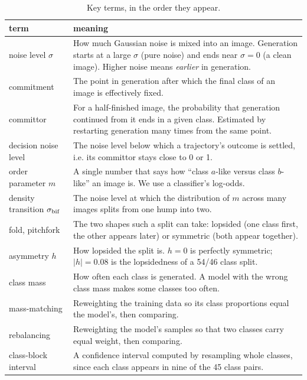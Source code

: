 \documentclass[11pt]{article}
\newcommand{\sbif}{\sigma_{\rm bif}}
\begin{document}
\begin{table}[t]
\centering
\caption{Key terms, in the order they appear.}
\label{tab:glossary}
\small
\begin{tabular}{p{3.6cm}p{11.4cm}}
\toprule
term & meaning \\
\midrule
noise level $\sigma$ & How much Gaussian noise is mixed into an image. Generation starts at a large $\sigma$ (pure noise) and ends near $\sigma=0$ (a clean image). Higher noise means \emph{earlier} in generation. \\
commitment & The point in generation after which the final class of an image is effectively fixed. \\
committor & For a half-finished image, the probability that generation continued from it ends in a given class. Estimated by restarting generation many times from the same point. \\
decision noise level & The noise level below which a trajectory's outcome is settled, i.e. its committor stays close to 0 or 1. \\
order parameter $m$ & A single number that says how ``class $a$-like versus class $b$-like'' an image is. We use a classifier's log-odds. \\
density transition $\sbif$ & The noise level at which the distribution of $m$ across many images splits from one hump into two. \\
fold, pitchfork & The two shapes such a split can take: lopsided (one class first, the other appears later) or symmetric (both appear together). \\
asymmetry $h$ & How lopsided the split is. $h=0$ is perfectly symmetric; $|h|=0.08$ is the lopsidedness of a 54/46 class split. \\
class mass & How often each class is generated. A model with the wrong class mass makes some classes too often. \\
mass-matching & Reweighting the training data so its class proportions equal the model's, then comparing. \\
rebalancing & Reweighting the model's samples so that two classes carry equal weight, then comparing. \\
class-block interval & A confidence interval computed by resampling whole classes, since each class appears in nine of the 45 class pairs. \\
\bottomrule
\end{tabular}
\end{table}
\end{document}

